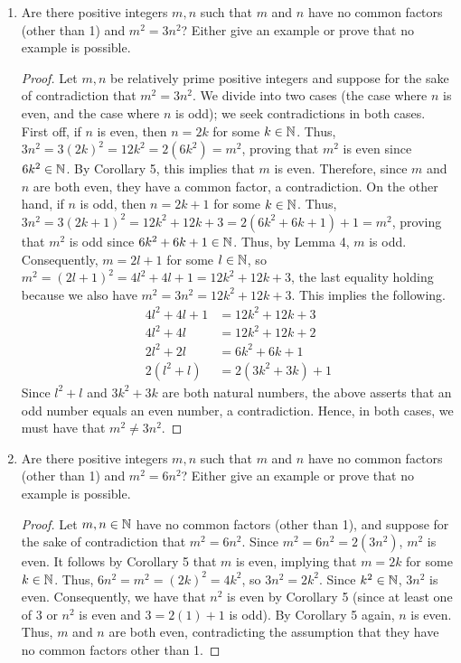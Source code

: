 \documentclass[../main.tex]{subfiles}
\begin{document}
\begin{exerciseM}\leavevmode
    \begin{enumerate}[label={\alph*)}]
        \item Are there positive integers $m,n$ such that $m$ and $n$ have no common factors (other than 1) and $m^2=3n^2$? Either give an example or prove that no example is possible.
        \begin{proof}
            Let $m,n$ be relatively prime positive integers and suppose for the sake of contradiction that $m^2=3n^2$. We divide into two cases (the case where $n$ is even, and the case where $n$ is odd); we seek contradictions in both cases. First off, if $n$ is even, then $n=2k$ for some $k\in\mathbb{N}$. Thus, $3n^2=3(2k)^2=12k^2=2(6k^2)=m^2$, proving that $m^2$ is even since $6k^2\in\mathbb{N}$. By Corollary 5, this implies that $m$ is even. Therefore, since $m$ and $n$ are both even, they have a common factor, a contradiction. On the other hand, if $n$ is odd, then $n=2k+1$ for some $k\in\mathbb{N}$. Thus, $3n^2=3(2k+1)^2=12k^2+12k+3=2(6k^2+6k+1)+1=m^2$, proving that $m^2$ is odd since $6k^2+6k+1\in\mathbb{N}$. Thus, by Lemma 4, $m$ is odd. Consequently, $m=2l+1$ for some $l\in\mathbb{N}$, so $m^2=(2l+1)^2=4l^2+4l+1=12k^2+12k+3$, the last equality holding because we also have $m^2=3n^2=12k^2+12k+3$. This implies the following.
            \begin{align*}
                4l^2+4l+1 &= 12k^2+12k+3\\
                4l^2+4l &= 12k^2+12k+2\\
                2l^2+2l &= 6k^2+6k+1\\
                2(l^2+l) &= 2(3k^2+3k)+1
            \end{align*}
            Since $l^2+l$ and $3k^2+3k$ are both natural numbers, the above asserts that an odd number equals an even number, a contradiction. Hence, in both cases, we must have that $m^2\neq 3n^2$.
        \end{proof}
        \item Are there positive integers $m,n$ such that $m$ and $n$ have no common factors (other than 1) and $m^2=6n^2$? Either give an example or prove that no example is possible.
        \begin{proof}
            Let $m,n\in\mathbb{N}$ have no common factors (other than 1), and suppose for the sake of contradiction that $m^2=6n^2$. Since $m^2=6n^2=2(3n^2)$, $m^2$ is even. It follows by Corollary 5 that $m$ is even, implying that $m=2k$ for some $k\in\mathbb{N}$. Thus, $6n^2=m^2=(2k)^2=4k^2$, so $3n^2=2k^2$. Since $k^2\in\mathbb{N}$, $3n^2$ is even. Consequently, we have that $n^2$ is even by Corollary 5 (since at least one of 3 or $n^2$ is even and $3=2(1)+1$ is odd). By Corollary 5 again, $n$ is even. Thus, $m$ and $n$ are both even, contradicting the assumption that they have no common factors other than 1.

\end{proof}
\end{enumerate}
\end{exerciseM}
\end{document}

